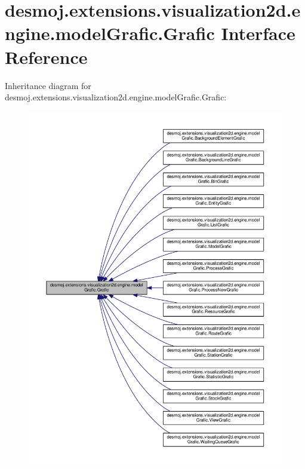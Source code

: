 \section{desmoj.\-extensions.\-visualization2d.\-engine.\-model\-Grafic.\-Grafic Interface Reference}
\label{interfacedesmoj_1_1extensions_1_1visualization2d_1_1engine_1_1model_grafic_1_1_grafic}


Inheritance diagram for desmoj.\-extensions.\-visualization2d.\-engine.\-model\-Grafic.\-Grafic\-:
\nopagebreak
\begin{figure}[H]
\begin{center}
\leavevmode
\includegraphics[width=350pt]{interfacedesmoj_1_1extensions_1_1visualization2d_1_1engine_1_1model_grafic_1_1_grafic__inherit__graph}
\end{center}
\end{figure}


